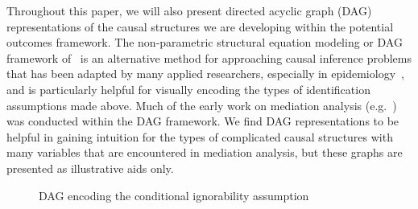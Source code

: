 Throughout this paper, we will also present directed acyclic graph (DAG) representations of the causal structures 
we are developing within the potential outcomes framework. The non-parametric structural equation 
modeling or DAG framework of~\cite{pearl2000} is an alternative method 
for approaching causal inference problems that has been adapted by many applied researchers, especially in 
epidemiology~\citep{hernan2024}, and is particularly helpful for visually encoding the types of identification 
assumptions made above. Much of the early work on mediation analysis (e.g.~\citep{pearl2001,avinetal2005}) was
conducted within the DAG framework. We find DAG representations to be helpful in gaining intuition for the types of 
complicated causal structures with many variables that are encountered in mediation analysis, but these graphs are 
presented as illustrative aids only. 

\begin{figure}[ht]
\centering
{}
\caption[]{DAG encoding the conditional ignorability assumption}
\label{fig:one_mediator_dag}
\end{figure}

